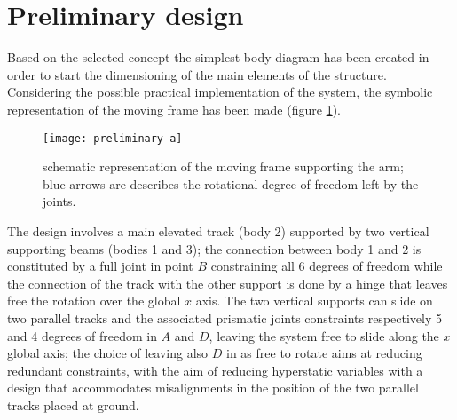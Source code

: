 \section{Preliminary design}
	Based on the selected concept the simplest body diagram has been created in order to start the dimensioning of the main elements of the structure. Considering the possible practical implementation of the system, the symbolic representation of the moving frame has been made (figure \ref{fig:freebodydiagramframe}).
	
	\begin{figure}[bht]
		\centering \texttt{[image: preliminary-a]}
		\caption{schematic representation of the moving frame supporting the arm; blue arrows are describes the rotational degree of freedom left by the joints.}
		\label{fig:freebodydiagramframe}
	\end{figure}
	
	The design involves a main elevated track (body 2) supported by two vertical supporting beams (bodies 1 and 3); the connection between body 1 and 2 is constituted by a full joint in point $B$ constraining all 6 degrees of freedom while the connection of the track with the other support is done by a hinge that leaves free the rotation over the global $x$ axis. The two vertical supports can slide on two parallel tracks and the associated prismatic joints constraints respectively 5 and 4 degrees of freedom in $A$ and $D$, leaving the system free to slide along the $x$ global axis; the choice of leaving also $D$ in as free to rotate aims at reducing redundant constraints, with the aim of reducing hyperstatic variables with a design that accommodates misalignments in the position of the two parallel tracks placed at ground.
	
